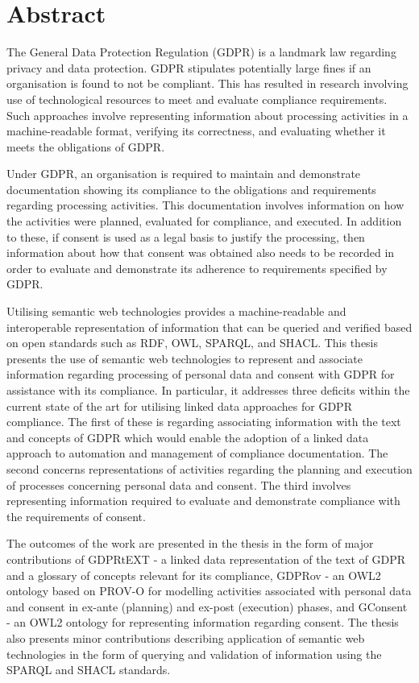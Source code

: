 \chapter*{Abstract}
The General Data Protection Regulation (GDPR) is a landmark law regarding privacy and data protection.
GDPR stipulates potentially large fines if an organisation is found to not be compliant.
This has resulted in research involving use of technological resources to meet and evaluate compliance requirements.
Such approaches involve representing information about processing activities in a machine-readable format, verifying its correctness, and evaluating whether it meets the obligations of GDPR.

Under GDPR, an organisation is required to maintain and demonstrate documentation showing its compliance to the obligations and requirements regarding processing activities.
This documentation involves information on how the activities were planned, evaluated for compliance, and executed.
In addition to these, if consent is used as a legal basis to justify the processing, then information about how that consent was obtained also needs to be recorded in order to evaluate and demonstrate its adherence to requirements specified by GDPR.

Utilising semantic web technologies provides a machine-readable and interoperable representation of information that can be queried and verified based on open standards such as RDF, OWL, SPARQL, and SHACL.
This thesis presents the use of semantic web technologies to represent and associate information regarding processing of personal data and consent with GDPR for assistance with its compliance.
In particular, it addresses three deficits within the current state of the art for utilising linked data approaches for GDPR compliance.
The first of these is regarding associating information with the text and concepts of GDPR which would enable the adoption of a linked data approach to automation and management of compliance documentation.
The second concerns representations of activities regarding the planning and execution of processes concerning personal data and consent.
The third involves representing information required to evaluate and demonstrate compliance with the requirements of consent.

The outcomes of the work are presented in the thesis in the form of major contributions of GDPRtEXT - a linked data representation of the text of GDPR and a glossary of concepts relevant for its compliance, GDPRov - an OWL2 ontology based on PROV-O for modelling activities associated with personal data and consent in ex-ante (planning) and ex-post (execution) phases, and GConsent - an OWL2 ontology for representing information regarding consent.
The thesis also presents minor contributions describing application of semantic web technologies in the form of querying and validation of information using the SPARQL and SHACL standards. 